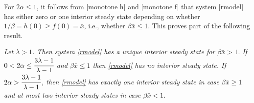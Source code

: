 \documentclass[11pt]{article}
\begin{document}


For $2\alpha\leq 1$, it follows from \eqref{monotone h} and
\eqref{monotone f} that system \eqref{rmodel} has either zero or
one interior steady state depending on whether $1/\beta   = h(0)
\geq f(0)=\bar x$, i.e., whether  $\beta  \bar x \leq 1$.  This
proves part of the following result.

\medskip


 {\em Let $\lambda>1$. Then system
\eqref{rmodel} has a unique interior steady state for $\beta  \bar
x>1$. If $0<2\alpha\leq \cfrac{3\lambda-1}{\lambda-1}$ and $\beta
 \bar x\leq 1$ then \eqref{rmodel} has no interior steady state. If
$2\alpha> \cfrac{3\lambda-1}{\lambda-1}$, then \eqref{rmodel} has
exactly one interior steady state in case $\beta \bar x \geq 1$
and at most two interior  steady states in case $\beta  \bar x
<1$.}
\end{document}
